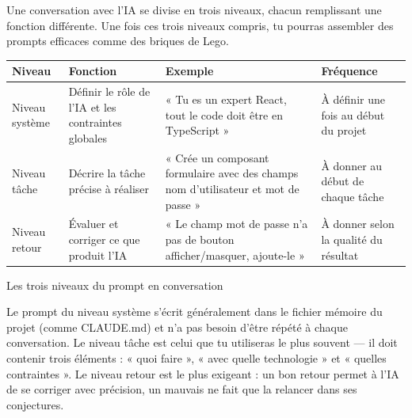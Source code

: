 


Une conversation avec l'IA se divise en trois niveaux, chacun remplissant une fonction différente. Une fois ces trois niveaux compris, tu pourras assembler des prompts efficaces comme des briques de Lego.

\begin{center}
\begin{tabularx}{\linewidth}{|X|X|X|X|}
\hline
\textbf{Niveau} & \textbf{Fonction} & \textbf{Exemple} & \textbf{Fréquence} \tabularnewline
\hline
Niveau système & Définir le rôle de l'IA et les contraintes globales & « Tu es un expert React, tout le code doit être en TypeScript » & À définir une fois au début du projet \tabularnewline
Niveau tâche & Décrire la tâche précise à réaliser & « Crée un composant formulaire avec des champs nom d'utilisateur et mot de passe » & À donner au début de chaque tâche \tabularnewline
Niveau retour & Évaluer et corriger ce que produit l'IA & « Le champ mot de passe n'a pas de bouton afficher/masquer, ajoute-le » & À donner selon la qualité du résultat \tabularnewline
\hline
\end{tabularx}
\end{center}

\begin{center}\small\color{gray}Les trois niveaux du prompt en conversation\end{center}

Le prompt du niveau système s'écrit généralement dans le fichier mémoire du projet (comme CLAUDE.md) et n'a pas besoin d'être répété à chaque conversation. Le niveau tâche est celui que tu utiliseras le plus souvent — il doit contenir trois éléments : « quoi faire », « avec quelle technologie » et « quelles contraintes ». Le niveau retour est le plus exigeant : un bon retour permet à l'IA de se corriger avec précision, un mauvais ne fait que la relancer dans ses conjectures.

